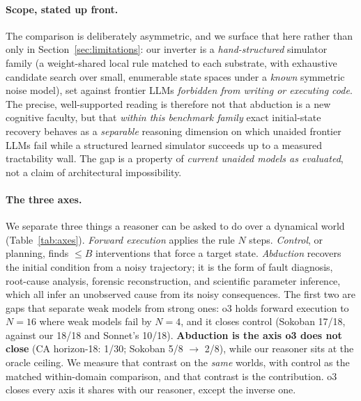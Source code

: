 \documentclass{article}
\begin{document}
\paragraph{Scope, stated up front.}
The comparison is deliberately asymmetric, and we surface that here rather than only in
Section~\ref{sec:limitations}: our inverter is a \emph{hand-structured} simulator family (a
weight-shared local rule matched to each substrate, with exhaustive candidate search over small,
enumerable state spaces under a \emph{known} symmetric noise model), set against frontier LLMs
\emph{forbidden from writing or executing code}. The precise, well-supported reading is therefore not
that abduction is a new cognitive faculty, but that \emph{within this benchmark family} exact
initial-state recovery behaves as a \emph{separable} reasoning dimension on which unaided frontier
LLMs fail while a structured learned simulator succeeds up to a measured tractability wall. The gap is
a property of \emph{current unaided models as evaluated}, not a claim of architectural impossibility.

\paragraph{The three axes.}
We separate three things a reasoner can be asked to do over a dynamical world
(Table~\ref{tab:axes}). \emph{Forward execution} applies the rule $N$ steps. \emph{Control}, or
planning, finds $\leq B$ interventions that force a target state. \emph{Abduction} recovers the
initial condition from a noisy trajectory; it is the form of fault diagnosis, root-cause
analysis, forensic reconstruction, and scientific parameter inference, which all infer an unobserved
cause from its noisy consequences. The first two are gaps that separate weak models from
strong ones: o3 holds forward execution to $N{=}16$ where weak models fail by $N{=}4$, and it closes control (Sokoban 17/18,
against our 18/18 and Sonnet's 10/18). \textbf{Abduction is the axis o3 does not close} (CA
horizon-18: 1/30; Sokoban 5/8 $\rightarrow$ 2/8), while our reasoner sits at the oracle ceiling. We
measure that contrast on the \emph{same} worlds, with control as the matched within-domain
comparison, and that contrast is the contribution. o3 closes every axis it shares with our reasoner,
except the inverse one.
\end{document}
